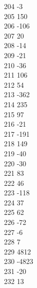 { 204	-3 \\
 205	150 \\
 206	-106 \\
 207	20 \\
 208	-14 \\
 209	-21 \\
 210	-36 \\
 211	106 \\
 212	54 \\
 213	-362 \\
 214	235 \\
 215	97 \\
 216	-21 \\
 217	-191 \\
 218	149 \\
 219	-40 \\
 220	-30 \\
 221	83 \\
 222	46 \\
 223	-118 \\
 224	37 \\
 225	62 \\
 226	-72 \\
 227	-6 \\
 228	7 \\
 229	4812 \\
 230	-4823 \\
 231	-20 \\
 232	13 \\
}
